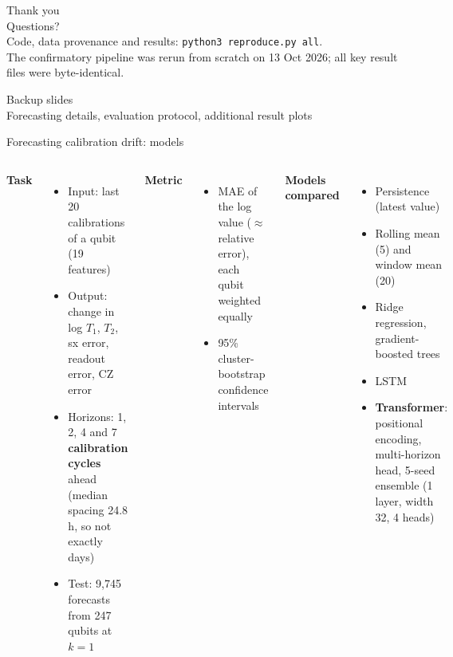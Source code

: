 \documentclass[aspectratio=169,11pt]{beamer}
\begin{document}
\begin{frame}
\centering
\vspace{1.5cm}
{\Huge \textcolor{qblue}{Thank you}}\\[0.6cm]
{\Large Questions?}\\[1.0cm]
{\small Code, data provenance and results: \texttt{python3 reproduce.py all}.\\ The confirmatory pipeline was rerun from scratch on 13 Oct 2026; all key result files were byte-identical.}
\end{frame}

\appendix
\begin{frame}
\centering
\vspace{2cm}
{\LARGE \textcolor{qblue}{Backup slides}}\\[0.5cm]
{\small Forecasting details, evaluation protocol, additional result plots}
\end{frame}

\begin{frame}{Forecasting calibration drift: models}
\small
\begin{columns}[T]
\textbf{Task}
\begin{itemize}
\item Input: last 20 calibrations of a qubit (19 features)
\item Output: change in log $T_1$, $T_2$, sx error, readout error, CZ error
\item Horizons: 1, 2, 4 and 7 \textbf{calibration cycles} ahead (median spacing 24.8 h, so not exactly days)
\item Test: 9,745 forecasts from 247 qubits at $k=1$
\end{itemize}
\textbf{Metric}
\begin{itemize}
\item MAE of the log value ($\approx$ relative error), each qubit weighted equally
\item 95\% cluster-bootstrap confidence intervals
\end{itemize}
\textbf{Models compared}
\begin{itemize}
\item Persistence (latest value)
\item Rolling mean (5) and window mean (20)
\item Ridge regression, gradient-boosted trees
\item LSTM
\item \textbf{Transformer}: positional encoding, multi-horizon head, 5-seed ensemble (1 layer, width 32, 4 heads)
\end{itemize}
\end{columns}
\end{frame}
\end{document}
